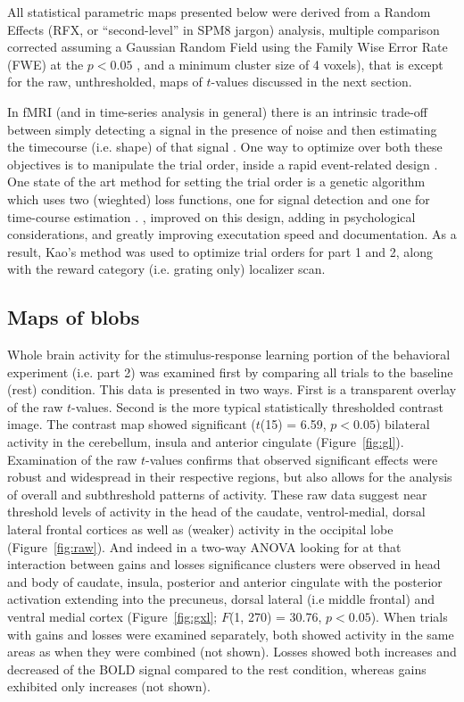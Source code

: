 \documentclass[doc,12pt]{apa}        %
\begin{document}
All statistical parametric maps presented below were derived from a Random Effects (RFX, or ``second-level'' in SPM8 jargon) analysis, multiple comparison corrected assuming a Gaussian Random Field using the Family Wise Error Rate (FWE) at the $p < 0.05$ \cite{Worsley:1996p9367}, and a minimum cluster size of 4 voxels), that is except for the raw, unthresholded, maps of $t$-values discussed in the next section.

In fMRI (and in time-series analysis in general) there is an intrinsic trade-off between simply detecting a signal in the presence of noise and then estimating the timecourse (i.e. shape) of that signal \cite{Dale:1999p7901,Birn:2002p1777,Liu:2004p2141}.   One way to optimize over both these objectives is to manipulate the trial order, inside a rapid event-related design \cite{Miezin:2000p7924}.  One state of the art method for setting the trial order is a genetic algorithm which uses two (wieghted) loss functions, one for signal detection and one for time-course estimation \cite{Wager:2003p2980}. , improved on this design, adding in psychological considerations, and greatly improving executation speed and documentation.  As a result, Kao's method was used to optimize trial orders for part 1 and 2, along with the reward category (i.e. grating only) localizer scan.

\subsection{Maps of blobs}
\label{sub:blob}
Whole brain activity for the stimulus-response learning portion of the behavioral experiment (i.e. part 2) was examined first by comparing all trials to the baseline (rest) condition.  This data is presented in two ways.  First is a transparent overlay of the raw $t$-values.  Second is the more typical statistically thresholded contrast image.  The contrast map showed significant ($t$(15) = 6.59, $p< 0.05$) bilateral activity in the cerebellum, insula and anterior cingulate (Figure~\ref{fig:gl}).  Examination of the raw $t$-values confirms that observed significant effects were robust and widespread in their respective regions, but also allows for the analysis of overall and subthreshold patterns of activity.  These raw data suggest near threshold levels of activity in the head of the caudate, ventrol-medial, dorsal lateral frontal cortices as well as (weaker) activity in the occipital lobe (Figure~\ref{fig:raw}).  And indeed in a two-way ANOVA looking for at that interaction between gains and losses significance clusters were observed in head and body of caudate, insula, posterior and anterior cingulate with the posterior activation extending into the precuneus, dorsal lateral (i.e middle frontal) and ventral medial cortex (Figure~\ref{fig:gxl}; $F$(1, 270) = 30.76, $p < 0.05$).  When trials with gains and losses were examined separately, both showed activity in the same areas as when they were combined (not shown).  Losses showed both increases and decreased of the BOLD signal compared to the rest condition, whereas gains exhibited only increases (not shown).
\end{document}
